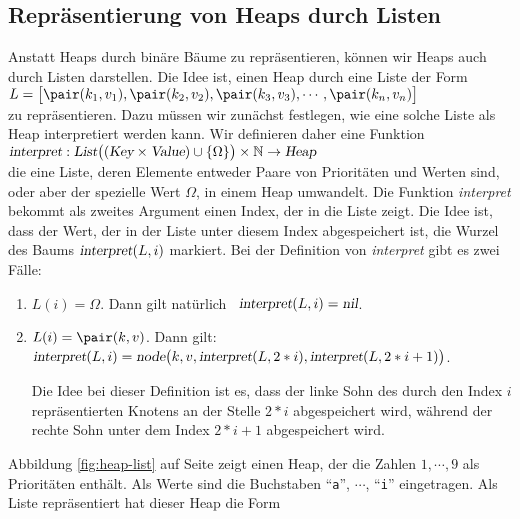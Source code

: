 \subsection{Repr\"asentierung von Heaps durch Listen}
Anstatt  Heaps durch bin\"are B\"aume zu repr\"asentieren, k\"onnen wir Heaps auch
durch Listen darstellen.   Die Idee ist, einen Heap durch eine  Liste der Form \\[0.1cm]
\hspace*{1.3cm} 
$L = \bigl[ \pair(k_1,v_1), \pair(k_2,v_2), \pair(k_3,v_3), \cdots, \pair(k_n,v_n) \bigr]$
\\[0.1cm]
zu repr\"asentieren.  Dazu m\"ussen wir zun\"achst festlegen, wie eine solche Liste als Heap
interpretiert werden kann.  Wir definieren daher eine Funktion \\[0.1cm]
\hspace*{1.3cm} 
$\textsl{interpret}: \textsl{List}\bigl((\textsl{Key}\times \textsl{Value})\cup \{\Omega\}\bigr) \times \mathbb{N}  \rightarrow \textsl{Heap}$
\\[0.1cm]
die eine Liste, deren Elemente entweder Paare von Priorit\"aten und Werten sind, oder aber
der spezielle Wert $\Omega$, in einem Heap umwandelt.  Die Funktion \textsl{interpret}
bekommt als zweites Argument einen Index, der in die Liste zeigt. Die Idee ist, dass der
Wert, der in der Liste unter diesem Index abgespeichert ist, die Wurzel des Baums
$\textsl{interpret}(L,i)$ markiert.  Bei der Definition von \textsl{interpret} gibt es zwei
F\"alle:
\begin{enumerate}
\item $L(i) = \Omega$.  Dann gilt nat\"urlich \ 
       $\textsl{interpret}(L,i) = \textsl{nil}$.
\item $L(i) = \pair(k, v)$. Dann gilt:\\[0.1cm]
      \hspace*{1.3cm} 
      $\textsl{interpret}(L,i) = \textsl{node}\bigl(k,v,\textsl{interpret}(L,2*i),\textsl{interpret}(L,2*i+1)\bigr)$.

      Die Idee bei dieser Definition ist es, dass der linke Sohn des durch den Index $i$
      repr\"asentierten Knotens an der Stelle $2*i$ abgespeichert wird, w\"ahrend der rechte
      Sohn unter dem Index $2*i + 1$ abgespeichert wird.
\end{enumerate}
Abbildung \ref{fig:heap-list} auf Seite \pageref{fig:heap-list} zeigt einen Heap, der die Zahlen $1, \cdots, 9$ als
Priorit\"aten enth\"alt.  Als Werte sind die Buchstaben ``\texttt{a}'', $\cdots$,
``\texttt{i}'' eingetragen.
  Als Liste repr\"asentiert hat dieser Heap die Form \\[0.1cm]
